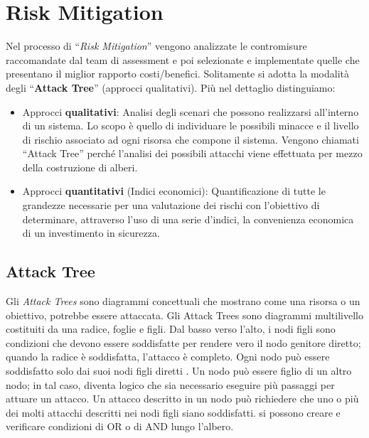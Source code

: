 \section{Risk Mitigation}

Nel processo di ``\textit{Risk Mitigation}'' vengono analizzate le contromisure
raccomandate dal team di
assessment e poi selezionate e implementate quelle che presentano il
miglior rapporto costi/benefici.
Solitamente si adotta la modalità degli ``\textbf{Attack Tree}''
(approcci qualitativi).
Più nel dettaglio distinguiamo:

\begin{itemize}
    \item Approcci \textbf{qualitativi}: Analisi degli scenari che possono
          realizzarsi all'interno di un sistema.
          Lo scopo è quello di individuare le possibili minacce e il livello di
          rischio associato ad ogni
          risorsa che compone il sistema. Vengono chiamati ``Attack Tree'' perché
          l'analisi dei
          possibili attacchi viene effettuata per mezzo della costruzione di alberi.
    \item Approcci \textbf{quantitativi} (Indici economici): Quantificazione di
          tutte le grandezze necessarie
          per una valutazione dei rischi con l'obiettivo di determinare,
          attraverso l'uso di una serie
          d'indici, la convenienza economica di un investimento in sicurezza.
\end{itemize}

\subsection{Attack Tree}

Gli \textit{Attack Trees} sono diagrammi concettuali che mostrano come una risorsa
o un obiettivo, potrebbe essere
attaccata.
Gli Attack Trees sono diagrammi multilivello costituiti da una radice, foglie e
figli. Dal basso verso l'alto, i nodi
figli sono condizioni che devono essere soddisfatte per rendere vero il nodo
genitore diretto; quando la radice è
soddisfatta, l'attacco è completo. Ogni nodo può essere soddisfatto solo dai
suoi nodi figli diretti . Un nodo può
essere figlio di un altro nodo; in tal caso, diventa logico che sia necessario
eseguire più passaggi per attuare un
attacco. Un attacco descritto in un nodo può richiedere che uno o più dei molti
attacchi descritti nei nodi figli siano
soddisfatti. si possono creare e verificare condizioni di OR o di AND lungo
l'albero.

